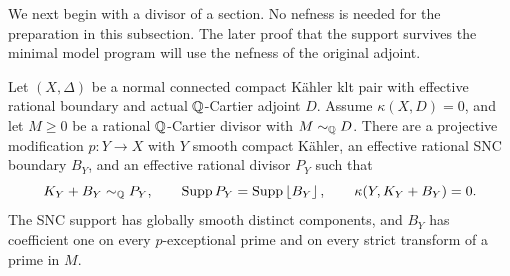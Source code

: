 We next begin with a divisor of a section.  No nefness is needed for the
preparation in this subsection.  The later proof that the support survives
the minimal model program will use the nefness of the original adjoint.

\begin{lemma}\label{lem:supported-preparation}
Let \((X,\Delta)\) be a normal connected compact K\"ahler klt pair with
effective rational boundary and actual \(\mathbb Q\)-Cartier adjoint \(D\).
Assume \(\kappa(X,D)=0\), and let \(M\geq0\) be a rational
\(\mathbb Q\)-Cartier divisor with \(M\sim_\mathbb Q D\).  There are a projective
modification \(p:Y\to X\) with \(Y\) smooth compact K\"ahler, an effective rational
SNC boundary \(B_Y\), and an effective rational divisor \(P_Y\) such that
\[
 K_Y+B_Y\sim_\mathbb Q P_Y,\qquad
 \operatorname{Supp} P_Y=\operatorname{Supp}\left\lfloor B_Y\right\rfloor,\qquad
 \kappa(Y,K_Y+B_Y)=0.
\]
The SNC support has globally smooth distinct components, and \(B_Y\) has
coefficient one on every \(p\)-exceptional prime and on every strict
transform of a prime in \(M\).
\end{lemma}
